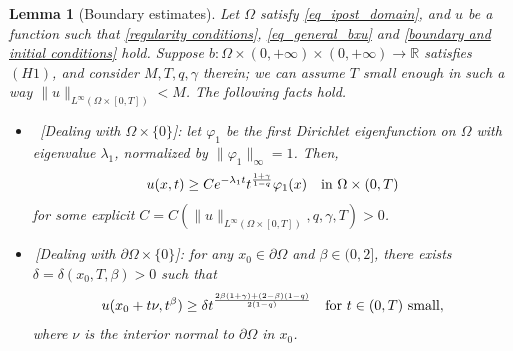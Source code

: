 \documentclass[11pt, reqno]{amsart}
\newtheorem{lemma}{Lemma}[section]
\theoremstyle{definition}
\numberwithin{equation}{section}
\newcommand{\R}{\mathbb{R}}
\def\norm#1{\|#1\|}
\begin{document}
\begin{lemma}[Boundary estimates]
\label{lem_behav_boundar_omega}
\label{lem_behav_t=0}
Let $\Omega$ satisfy \eqref{eq_ipost_domain}, and $u$ be a function such that \eqref{regularity conditions}, \eqref{eq_general_bxu} and \eqref{boundary and initial conditions} hold.
Suppose 	
$b\colon\Omega\times(0,+\infty) \times (0,+\infty)\to \R$ satisfies \hyperlink{H1}{\( (H1) \)}, and consider $M, T, q,\gamma$ therein; we can assume $T$ small enough in such a way $\norm{u}_{L^{\infty}(\Omega\times[0,T])}<M$.
 The following facts hold.

\begin{itemize}

\item[(i)] $\,$ \emph{[}Dealing with $ \Omega \times \{0\}$\emph{]}:
let $\varphi_1$ be the first Dirichlet eigenfunction on $\Omega$ with eigenvalue $\lambda_1$, normalized by $\norm{\varphi_1}_{\infty}=1$. 
Then, $$u(x,t) \geq C e^{-\lambda_1 t} t^{\frac{1+\gamma}{1-q}}\varphi_1(x) \quad \hbox{in $\Omega \times (0,T)$}$$
for some explicit $C=C(\norm{u}_{L^{\infty}(\Omega \times [0,T])}, q, \gamma, T)>0$. 

\item[(ii)] $\,$\emph{[}Dealing with $\partial \Omega \times \{0\}$\emph{]}:
for any $x_0 \in \partial \Omega$ and $\beta \in (0,2]$, there exists $\delta=\delta(x_0,T, \beta)>0$ such that
$$u(x_0+t\nu,t^{\beta})\geq \delta t^{\frac{2\beta(1+\gamma)+(2-\beta)(1-q) }{2(1-q)}} \quad \hbox{for $t\in (0,T)$ small},$$
where $\nu$ is the interior normal to $\partial \Omega$ in $x_0$. 
\end{itemize}
\end{lemma}
\end{document}
